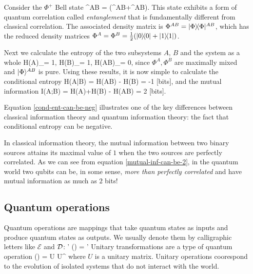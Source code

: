 \documentclass[aps,11pt,twoside,letterpaper]{article}
\def\E{\mathcal{E}}
\begin{document}
			\begin{example}	\label{example:EPR-pair}
				Consider the $\Phi^{+}$\! Bell state 
				\be
					\ket{\Phi}^{AB} = (^{AB}+^{AB}).
				\ee
				This state exhibits a form of quantum correlation called \emph{entanglement} that is fundamentally
				different from classical correlation.
				The associated density matrix is $\Phi^{AB} = | \Phi \rangle\!\langle \Phi |^{AB}$, which has
				the reduced density matrices $\Phi^A = \Phi^B = \tfrac{1}{2}(| 0 \rangle\!\langle 0 | + | 1 \rangle\!\langle 1 |)$.
				
				Next we calculate the entropy of the two subsystems $A$, $B$ and the system as a whole 
				\be
					H(A)_\Phi = 1, 	\qquad
					H(B)_\Phi = 1, 	\qquad
					H(AB)_\Phi = 0,
				\ee
				since $\Phi^A,\Phi^B$ are maximally mixed and $| \Phi \rangle^{AB}$ is pure.
				Using these results, it is now simple to calculate the conditional entropy
				\be	\label{cond-ent-can-be-neg}
					H(A|B)	=	H(AB) - H(B)	= -1 \textup{ [bits]},
				\ee
				and the mutual information
				\be	\label{mutual-inf-can-be-2}
					I(A;B)	=	H(A)+H(B) - H(AB)	= 2 \textup{ [bits]}.
				\ee
			\end{example}
			
			Equation \eqref{cond-ent-can-be-neg} illustrates one of the key differences between classical information
			theory and quantum information theory: the fact that conditional entropy can be negative.
			
			In classical information theory, the mutual information between two binary sources attains its maximal value
			of $1$ when the two sources are perfectly correlated. As we can see from equation 
			\eqref{mutual-inf-can-be-2}, in the quantum world two qubits can be, in some sense,
			\emph{more than perfectly correlated} and have mutual information as much as $2$ bits!
			

		\subsection{Quantum operations}	

			Quantum operations are mappings that take quantum states as inputs and produce quantum
			states as outputs. We usually denote them by calligraphic letters like $\E$ and ${\cal D}$:
			\be
				\rho \stackrel{\E}{\longrightarrow} \rho' 	\qquad \E(\rho) = \rho'
			\ee
			Unitary transformations are a type of quantum operation
			\be
				\E(\rho) = U \rho U^{\dag}
			\ee
			where $U$ is a unitary matrix. Unitary operations coorespond to the evolution of isolated
            systems that do not interact with the world.
\end{document}
